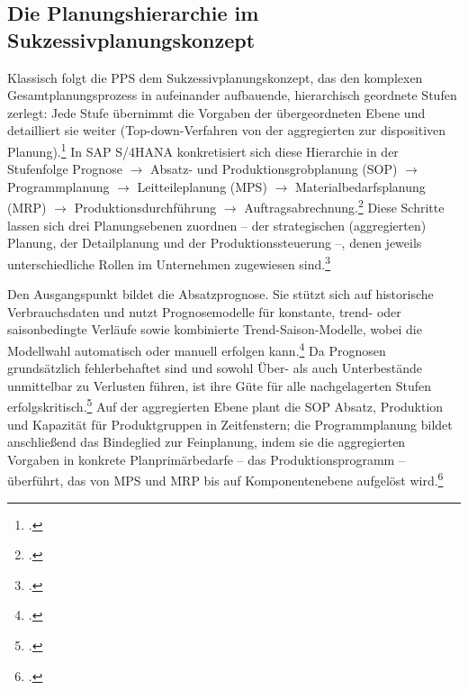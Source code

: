 \subsection{Die Planungshierarchie im Sukzessivplanungskonzept}
Klassisch folgt die PPS dem Sukzessivplanungskonzept, das den komplexen Gesamtplanungsprozess in aufeinander aufbauende, hierarchisch geordnete Stufen zerlegt: Jede Stufe übernimmt die Vorgaben der übergeordneten Ebene und detailliert sie weiter (Top-down-Verfahren von der aggregierten zur dispositiven Planung).\footcite[Vgl.][S. 20 f.]{Kurbel.2021} In SAP S/4HANA konkretisiert sich diese Hierarchie in der Stufenfolge Prognose $\rightarrow$ Absatz- und Produktionsgrobplanung (SOP) $\rightarrow$ Programmplanung $\rightarrow$ Leitteileplanung (MPS) $\rightarrow$ Materialbedarfsplanung (MRP) $\rightarrow$ Produktionsdurchführung $\rightarrow$ Auftragsabrechnung.\footcite[Vgl.][Folie 24 f.]{SAPUCC.2023} Diese Schritte lassen sich drei Planungsebenen zuordnen -- der strategischen (aggregierten) Planung, der Detailplanung und der Produktionssteuerung --, denen jeweils unterschiedliche Rollen im Unternehmen zugewiesen sind.\footcite[Vgl.][Folie 25 f.]{SAPUCC.2023}

Den Ausgangspunkt bildet die Absatzprognose. Sie stützt sich auf historische Verbrauchsdaten und nutzt Prognosemodelle für konstante, trend- oder saisonbedingte Verläufe sowie kombinierte Trend-Saison-Modelle, wobei die Modellwahl automatisch oder manuell erfolgen kann.\footcite[Vgl.][Folie 27 f.]{SAPUCC.2023} Da Prognosen grundsätzlich fehlerbehaftet sind und sowohl Über- als auch Unterbestände unmittelbar zu Verlusten führen, ist ihre Güte für alle nachgelagerten Stufen erfolgskritisch.\footcite[Vgl.][Folie 27]{SAPUCC.2023} Auf der aggregierten Ebene plant die SOP Absatz, Produktion und Kapazität für Produktgruppen in Zeitfenstern; die Programmplanung bildet anschließend das Bindeglied zur Feinplanung, indem sie die aggregierten Vorgaben in konkrete Planprimärbedarfe -- das Produktionsprogramm -- überführt, das von MPS und MRP bis auf Komponentenebene aufgelöst wird.\footcite[Vgl.][Folie 29 ff.]{SAPUCC.2023}

